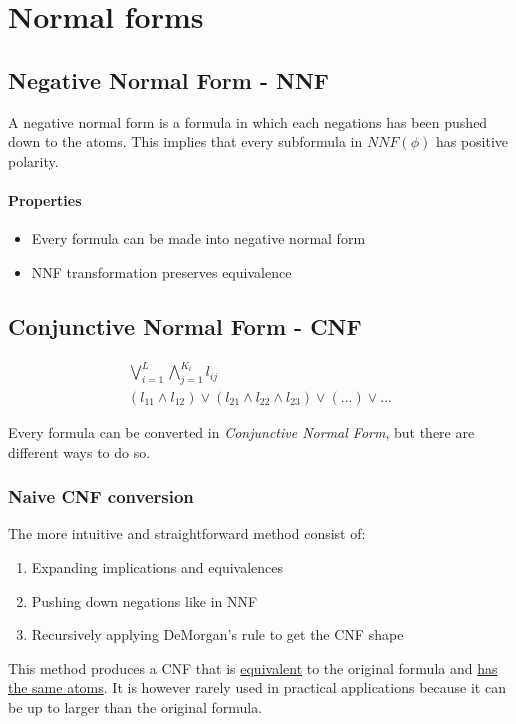 \documentclass{article}
\begin{document}
\section{Normal forms}
\subsection{Negative Normal Form - NNF}
A negative normal form is a formula in which each negations has been pushed down to the atoms. This implies that every subformula in $NNF(\phi)$ has positive polarity.

\paragraph{Properties}
\begin{itemize}
    \item Every formula can be made into negative normal form
    \item NNF transformation preserves equivalence
\end{itemize}

\subsection{Conjunctive Normal Form - CNF}
\begin{gather*}
\bigvee_{i=1}^L \bigwedge_{j=1}^{K_i} l_{ij} \\
(l_{11} \wedge l_{12})\vee(l_{21} \wedge l_{22} \wedge l_{23})\vee(...)\vee...
\end{gather*}

Every formula can be converted in \textit{Conjunctive Normal Form}, but there are different ways to do so.

\subsubsection{Naive CNF conversion}
The more intuitive and straightforward method consist of:
\begin{enumerate}
    \item Expanding implications and equivalences
    \item Pushing down negations like in NNF
    \item Recursively applying DeMorgan's rule to get the CNF shape
\end{enumerate}

This method produces a CNF that is \underline{equivalent} to the original formula and \underline{has the same atoms}. It is however rarely used in practical applications because it can be up to  larger than the original formula.
\end{document}
